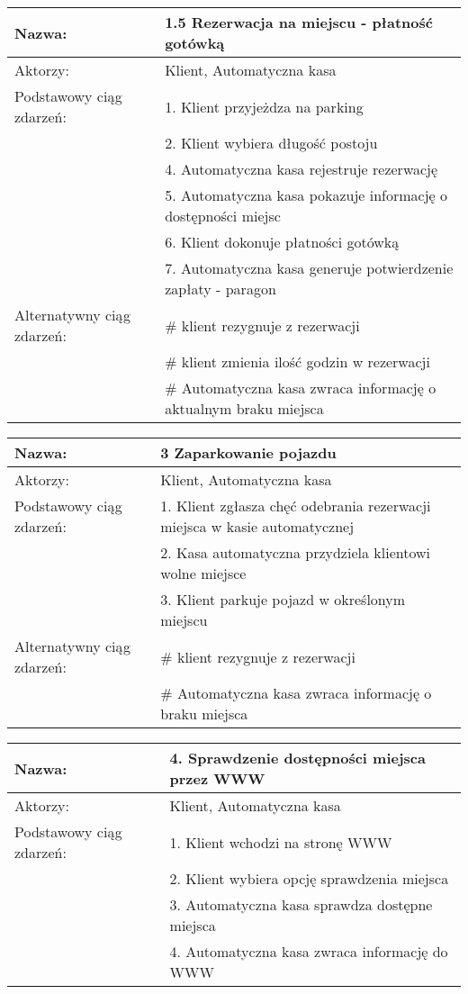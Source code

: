 \begin{center}
\vspace{1cm}

\begin{tabular}{|L{3cm}  L{13cm}|}
\hline
Nazwa: & 1.5 Rezerwacja na miejscu - płatność gotówką \\ \hline
Aktorzy: & Klient,  Automatyczna kasa \\ \hline
Podstawowy ciąg zdarzeń: & 1. Klient przyjeżdza na parking \\
 & 2. Klient wybiera długość postoju \\
 & 4. Automatyczna kasa rejestruje rezerwację \\
 & 5. Automatyczna kasa pokazuje informację o dostępności miejsc \\
 & 6. Klient dokonuje płatności gotówką \\
 & 7. Automatyczna kasa generuje potwierdzenie zapłaty - paragon \\ \hline
Alternatywny ciąg zdarzeń:  & \# klient rezygnuje z rezerwacji \\
 & \# klient zmienia ilość godzin w rezerwacji \\ 
 & \# Automatyczna kasa zwraca informację o aktualnym braku miejsca\\ \hline
\end{tabular}

\vspace{1cm}

\begin{tabular}{|L{3cm}  L{13cm}|}
\hline
Nazwa: & 3 Zaparkowanie pojazdu \\ \hline
Aktorzy: & Klient,  Automatyczna kasa \\ \hline
Podstawowy ciąg zdarzeń: & 1. Klient zgłasza chęć odebrania rezerwacji miejsca w kasie automatycznej\\
 & 2. Kasa automatyczna przydziela klientowi wolne miejsce\\
 & 3. Klient parkuje pojazd w określonym miejscu\\ \hline
Alternatywny ciąg zdarzeń:  & \# klient rezygnuje z rezerwacji \\
 & \# Automatyczna kasa zwraca informację o braku miejsca\\ \hline
\end{tabular}

\vspace{1cm}

\begin{tabular}{|L{3cm}  L{13cm}|}
\hline
Nazwa: & 4. Sprawdzenie dostępności miejsca przez WWW \\ \hline
Aktorzy: & Klient,  Automatyczna kasa \\ \hline
Podstawowy ciąg zdarzeń: & 1. Klient wchodzi na stronę WWW \\
 & 2. Klient wybiera opcję sprawdzenia miejsca \\
 & 3. Automatyczna kasa sprawdza dostępne miejsca \\
 & 4. Automatyczna kasa zwraca informację do WWW \\ \hline
\end{tabular}


\end{center}
